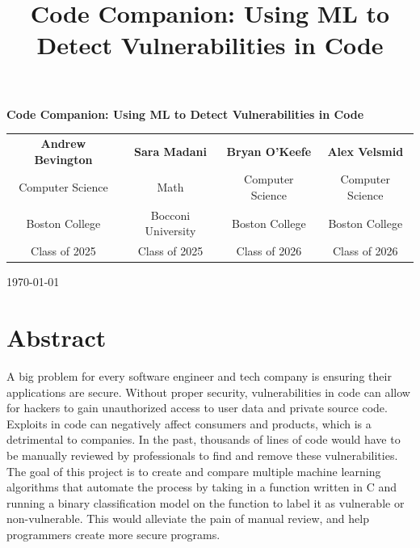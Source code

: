 \documentclass{article}
\title{\Large\textbf{Code Companion: Using ML to Detect Vulnerabilities in Code}}
\date{}  %
\begin{document}
\begin{titlepage}
\begin{center}
\vspace*{2cm}
{\huge\textbf{Code Companion: Using ML to Detect Vulnerabilities in Code}\par}
\vspace{2cm}

\begin{tabular*}{\textwidth}{@{\extracolsep{\fill}} *{4}{c}}
    \textbf{Andrew Bevington} & \textbf{Sara Madani} & \textbf{Bryan O'Keefe} & \textbf{Alex Velsmid} \\[0.0cm]
    Computer Science & Math & Computer Science & Computer Science \\[0.0cm]
    Boston College & Bocconi University & Boston College & Boston College \\[0.0cm]
    Class of 2025 & Class of 2025 & Class of 2026 & Class of 2026 \\
\end{tabular*}

\vfill
\today
\end{center}
\end{titlepage}

\section*{Abstract}
A big problem for every software engineer and tech company is ensuring their applications are
secure. Without proper security, vulnerabilities in code can allow for hackers to gain
unauthorized access to user data and private source code. Exploits in code can negatively
affect consumers and products, which is a detrimental to companies. In the past, thousands
of lines of code would have to be manually reviewed by professionals to find and remove these
vulnerabilities. The goal of this project is to create and compare multiple machine learning algorithms that
automate the process by taking in a function written in C and running a binary classification
model on the function to label it as vulnerable or non-vulnerable. This would alleviate the pain
of manual review, and help programmers create more secure programs.
\end{document}
